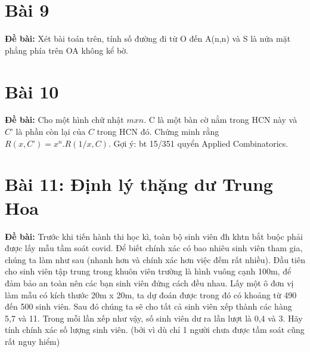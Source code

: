 \documentclass[12pt]{article}
\begin{document}
\begin{sloppypar}
\section{Bài 9}
\begin{tcolorbox}
    \textbf{Đề bài:} Xét bài toán trên, tính số đường đi từ O đến A(n,n) và S là nửa mặt phẳng phía trên OA không kể bờ.
\end{tcolorbox}

\section{Bài 10}
\begin{tcolorbox}
    \textbf{Đề bài:} Cho một hình chữ nhật \(mxn\). C là một bàn cờ nằm trong HCN này và \(C’\) là phần còn lại của \(C\) trong HCN đó.
    Chứng minh rằng \(R(x,C’)=x^{n} .R(1/x,C)\). Gợi ý: bt 15/351 quyển Applied Combinatorics.
\end{tcolorbox}

\section{Bài 11: Định lý thặng dư Trung Hoa}
\begin{tcolorbox}
    \textbf{Đề bài:} Trước khi tiến hành thi học kì, toàn bộ sinh viên đh khtn bắt buộc phải được lấy mẫu tầm soát covid. Để biết chính xác có bao nhiêu sinh viên tham gia, chúng ta làm như sau (nhanh hơn và chính xác hơn việc đếm rất nhiều).
    Đầu tiên cho sinh viên tập trung trong khuôn viên trường là hình vuông cạnh 100m, để đảm bảo an toàn nên các bạn sinh viên đứng cách đều nhau. Lấy một ô đơn vị làm mẫu có kích thước 20m x 20m, ta dự đoán được trong đó có khoảng từ 490 đến 500 sinh viên. Sau đó chúng ta sẽ cho tất cả sinh viên xếp thành các hàng 5,7 và 11. Trong mỗi lần xếp như vậy, số sinh viên dư ra lần lượt là 0,4 và 3. Hãy tính chính xác số lượng sinh viên. (bởi vì dù chỉ 1 người chưa được tầm soát cũng rất nguy hiểm)
\end{tcolorbox}
\end{sloppypar}
\end{document}
